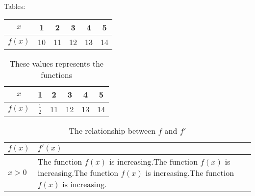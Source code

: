 \documentclass[11pt]{article}
\begin{document}
Tables:\\
\begin{tabular}{|c||c|c|c|c|c|} \hline
$x$ & 1 & 2 & 3 & 4 & 5\\ \hline
$f(x)$&10&11&12&13&14\\ \hline
\end{tabular}

\vspace{1cm}

\begin{table}[H]

\centering

\def\arraystretch{1.5} %
\begin{tabular}{|c||c|c|c|c|c|} \hline
$x$ & 1 & 2 & 3 & 4 & 5\\ \hline
$f(x)$&$\frac{1}{2}$&11&12&13&14\\ \hline
\end{tabular}

\caption{These values represents the functions}

\end{table}


\begin{table}[H]

\centering
\caption{The relationship between $f$ and $f'$} 
\def\arraystretch{1.5} %
\begin{tabular}{|l|p{3in}|} \hline %
$f(x)$ & $f'(x)$\\ \hline
$x>0$& The function $f(x)$ is increasing.The function $f(x)$ is increasing.The function $f(x)$ is increasing.The function $f(x)$ is increasing.\\ \hline
\end{tabular}

\end{table}
\end{document}
